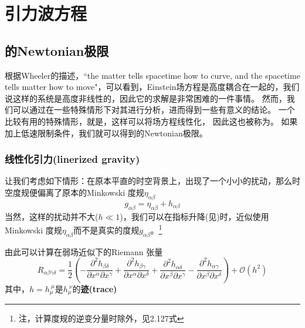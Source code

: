
\chapter{引力波方程}
\label{chap2}

\section{\GR 的Newtonian极限}
根据Wheeler的描述，``the matter tells spacetime how to curve, and the spacetime tells matter how to move"，可以看到，Einstein场方程是高度耦合在一起的，我们说这样的系统是高度非线性的，因此它的求解是非常困难的一件事情。
然而，我们可以通过在一些特殊情形下对其进行分析，进而得到一些有意义的结论。
一个比较有用的特殊情形，就是{}，这样可以将场方程线性化， 因此这也被称为{}。
如果加上低速限制条件，我们就可以得到\GR 的Newtonian极限。

\subsection{线性化引力(linerized gravity)}\label{sec:LinGrav}
让我们考虑如下情形：在原本平直的时空背景上，出现了一个小小的扰动，那么时空度规便偏离了原本的Minkowski 度规$\eta_{\alpha\beta}$
\begin{equation}\label{eq:LinearMetric} 
  g_{\alpha\beta}=  \eta _{\alpha\beta} + h_{\alpha\beta}
\end{equation}
当然，这样的扰动并不大($h \ll 1$)，我们可以在指标升降(见)时，近似使用Minkowski 度规$\eta _{\alpha\beta}$而不是真实的度规$g_{\alpha\beta}$。\footnote{注，计算度规的逆变分量时除外，见\cite{Creighton2011}2.127式}

由此可以计算在弱场近似下的Riemann 张量
\begin{equation}\label{eq:RiemannTensorLin}
  R_{\alpha\beta\gamma\delta}= \frac{1}{2}\left(- \frac{\partial^2 h_{\beta\delta}}{\partial x^\alpha \partial x^\gamma} + \frac{\partial^2 h_{\beta\gamma}}{\partial x^\alpha \partial x^\delta} + \frac{\partial^2 h_{\alpha\delta}}{\partial x^\beta \partial x^\gamma} - \frac{\partial^2 h_{\alpha\gamma}}{\partial x^\beta \partial x^\delta}  \right) + \mathcal{O}(h^2)
\end{equation}
其中，$h = h_\mu^{~\mu}$是$h_\mu^{~\nu}$的{\textbf{迹(trace)}}

